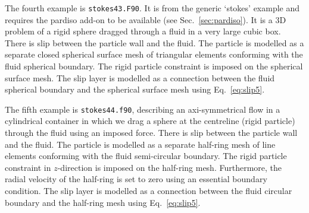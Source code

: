 The fourth example is \texttt{stokes43.F90}. It is from the generic `stokes' example and requires the pardiso add-on 
to be available (see Sec.~\ref{sec:pardiso}). It is a 3D problem of a rigid sphere dragged through a fluid
in a very large cubic box. There is slip between the particle wall and the fluid. The particle is modelled as a separate closed spherical surface mesh of triangular elements conforming with the fluid spherical boundary. The rigid particle constraint is imposed on the spherical surface mesh. The slip layer is modelled as a connection between the fluid spherical boundary and the spherical surface mesh using Eq.~\eqref{eq:slip5}.

The fifth example is \texttt{stokes44.f90}, 
describing an axi-symmetrical flow in a cylindrical container 
in which we drag a 
sphere at the centreline (rigid particle) through the fluid using an imposed force. There is slip between the particle wall and the fluid. The particle is modelled as a separate half-ring mesh of line elements conforming with the fluid semi-circular boundary. The rigid particle constraint in $z$-direction is
imposed on the half-ring mesh. Furthermore, the radial velocity of the half-ring is set to zero using an essential boundary condition. The slip layer is modelled as a connection between the fluid circular boundary and the half-ring mesh using Eq.~\eqref{eq:slip5}.


